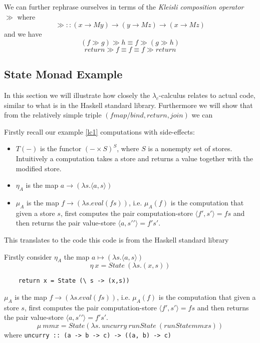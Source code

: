 We can further rephrase ourselves in terms
of the \textit{Kleisli composition operator} $\gg$ where
\begin{equation}
    \gg :: (x \rightarrow M y) \rightarrow (y \rightarrow M z) \rightarrow (x \rightarrow M z)
\end{equation}
and we have
\begin{equation}
    (f \gg g) \gg h \equiv f \gg (g \gg h)
\end{equation}
\begin{equation}
    return \gg f \equiv f \equiv f \gg return
\end{equation}

\subsection{State Monad Example}
In this section we will illustrate how closely 
the $\lambda_c$-calculus relates to actual code,
similar to what is in the Haskell standard library.
Furthermore we will show that from the relatively
simple triple $(fmap/bind,return,join)$ we can

Firstly recall our example \ref{lc1}
computations with side-effects:
\begin{itemize}
    \item $T(-)$ is the functor $(-\times S)^S$, where $S$ is a nonempty set of stores.
        Intuitively a computation takes a store and returns a value together with the modified store.
    \item $\eta_A$ is the map $a \rightarrow (\lambda s.\langle a,s \rangle)$
    \item $\mu_A$ is the map $f \rightarrow (\lambda s.eval(fs))$,
        i.e. $\mu_A(f)$ is the computation that given a store $s$,
        first computes the pair computation-store $\langle f\prime,s\prime\rangle = fs$
        and then returns the pair value-store $\langle a,s\prime\prime\rangle = f\prime s\prime$.
\end{itemize}

This translates to the code
this code is from the Haskell standard library

Firstly consider
$\eta_A$ the map $a \mapsto (\lambda s.\langle a,s \rangle)$
$$\eta\ x = State\ (\lambda s.(x,s))$$
\begin{verbatim}
    return x = State (\ s -> (x,s))
\end{verbatim}

$\mu_A$ is the map $f \rightarrow (\lambda s.eval(fs))$,
i.e. $\mu_A(f)$ is the computation that given a store $s$,
first computes the pair computation-store $\langle f\prime,s\prime\rangle = fs$
and then returns the pair value-store $\langle a,s\prime\prime\rangle = f\prime s\prime$.
$$\mu\ mmx = State (\lambda s.\ uncurry\ runState\ (runState mmx s))$$
where \texttt{uncurry :: (a -> b -> c) -> ((a, b) -> c)}

